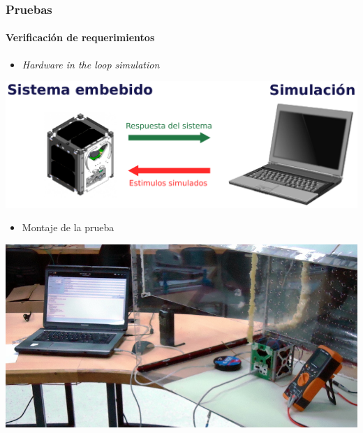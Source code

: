 \documentclass[xcolor=dvipsnames]{beamer}
\begin{document}
    \begin{frame}[squeeze]
        \frametitle{Pruebas}
        \framesubtitle{Verificación de requerimientos}
        
        \begin{itemize}
            \item \textit{Hardware in the loop simulation}
        \end{itemize}
        
        \begin{center}
            \includegraphics[height=0.3\textheight]{img/hil.pdf}
        \end{center}
        
        \begin{itemize}
            \item Montaje de la prueba
        \end{itemize}
        
        \begin{center}
            \includegraphics[height=0.45\textheight]{img/test_montaje.jpg}
        \end{center}
        
    \end{frame}
\end{document}
